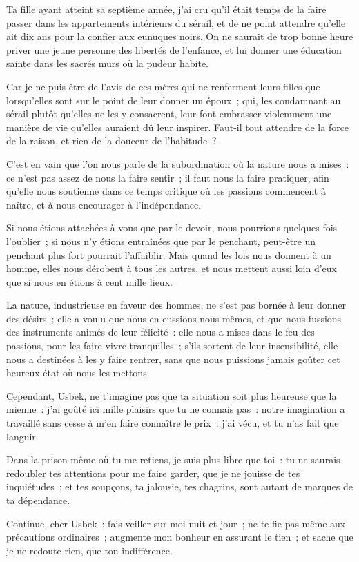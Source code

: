\documentclass[french,twoside]{book} %
\begin{document}
\noindent Ta fille ayant atteint sa septième année, j’ai cru qu’il était temps de la faire passer dans les appartements intérieurs du sérail, et de ne point attendre qu’elle ait dix ans pour la confier aux eunuques noirs. On ne saurait de trop bonne heure priver une jeune personne des libertés de l’enfance, et lui donner une éducation sainte dans les sacrés murs où la pudeur habite.\par
Car je ne puis être de l’avis de ces mères qui ne renferment leurs filles que lorsqu’elles sont sur le point de leur donner un époux ; qui, les condamnant au sérail plutôt qu’elles ne les y consacrent, leur font embrasser violemment une manière de vie qu’elles auraient dû leur inspirer. Faut-il tout attendre de la force de la raison, et rien de la douceur de l’habitude ?\par
C’est en vain que l’on nous parle de la subordination où la nature nous a mises : ce n’est pas assez de nous la faire sentir ; il faut nous la faire pratiquer, afin qu’elle nous soutienne dans ce temps critique où les passions commencent à naître, et à nous encourager à l’indépendance.\par
Si nous étions attachées à vous que par le devoir, nous pourrions quelques fois l’oublier ; si nous n’y étions entraînées que par le penchant, peut-être un penchant plus fort pourrait l’affaiblir. Mais quand les lois nous donnent à un homme, elles nous dérobent à tous les autres, et nous mettent aussi loin d’eux que si nous en étions à cent mille lieux.\par
La nature, industrieuse en faveur des hommes, ne s’est pas bornée à leur donner des désirs ; elle a voulu que nous en eussions nous-mêmes, et que nous fussions des instruments animés de leur félicité : elle nous a mises dans le feu des passions, pour les faire vivre tranquilles ; s’ils sortent de leur insensibilité, elle nous a destinées à les y faire rentrer, sans que nous puissions jamais goûter cet heureux état où nous les mettons.\par
Cependant, Usbek, ne t’imagine pas que ta situation soit plus heureuse que la mienne : j’ai goûté ici mille plaisirs que tu ne connais pas : notre imagination a travaillé sans cesse à m’en faire connaître le prix : j’ai vécu, et tu n’as fait que languir.\par
Dans la prison même où tu me retiens, je suis plus libre que toi : tu ne saurais redoubler tes attentions pour me faire garder, que je ne jouisse de tes inquiétudes ; et tes soupçons, ta jalousie, tes chagrins, sont autant de marques de ta dépendance.\par
Continue, cher Usbek : fais veiller sur moi nuit et jour ; ne te fie pas même aux précautions ordinaires ; augmente mon bonheur en assurant le tien ; et sache que je ne redoute rien, que ton indifférence.\par
\end{document}
